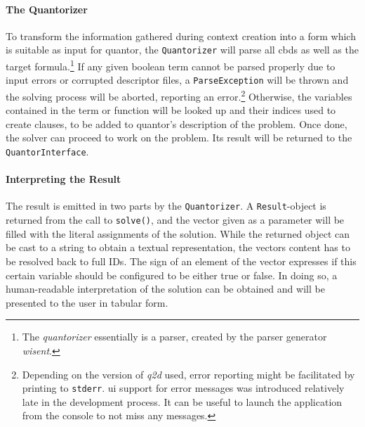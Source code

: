 	\paragraph{The Quantorizer}
	To transform the information gathered during context creation into a form which is suitable as input for \gls{quantor}, the \texttt{Quantorizer} will parse all \glspl{cbd} as well as the target formula.\footnote{
		The \emph{quantorizer} essentially is a parser, created by the parser generator \emph{wisent}\cite{wisent}.	
	}
	If any given boolean term cannot be parsed properly due to input errors or corrupted descriptor files, a \texttt{ParseException} will be thrown and the solving process will be aborted, reporting an error.\footnote{
		Depending on the version of \emph{q2d} used, error reporting might be facilitated by printing to \texttt{stderr}.
		\Gls{ui} support for error messages was introduced relatively late in the development process.
		It can be useful to launch the application from the console to not miss any messages.	
	}
	Otherwise, the variables contained in the term or function will be looked up and their indices used to create clauses, to be added to \gls{quantor}'s description of the problem.
	Once done, the solver can proceed to work on the problem.
	Its result will be returned to the \texttt{QuantorInterface}.
	
	\paragraph{Interpreting the Result}
	The result is emitted in two parts by the \texttt{Quantorizer}.
	A \texttt{Result}-object is returned from the call to \texttt{solve()}, and the vector given as a parameter will be filled with the literal assignments of the solution.
	While the returned object can be cast to a string to obtain a textual representation, the vectors content has to be resolved back to full IDs.
	The sign of an element of the vector expresses if this certain variable should be configured to be either true or false.
	In doing so, a human-readable interpretation of the solution can be obtained and will be presented to the user in tabular form.